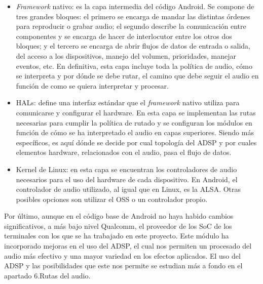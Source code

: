 \begin{itemize}
	\item{\textit{Framework} nativo: es la capa intermedia del código Android. Se compone de tres grandes bloques: el primero se encarga de mandar las distintas órdenes para reproducir o grabar audio; el segundo describe la comunicación entre componentes y se encarga de hacer de interlocutor entre los otros dos bloques; y el tercero se encarga de abrir flujos de datos de entrada o salida, del acceso a los dispositivos, manejo del volumen, prioridades, manejar eventos, etc. En definitiva, esta capa incluye toda la política de audio, cómo se interpreta y por dónde se debe rutar, el camino que debe seguir el audio en función de como se quiera interpretar y procesar.}
\end{itemize}

\begin{itemize}
	\item{\glspl{HAL}: define una interfaz estándar que el \textit{framework} nativo utiliza para comunicarse y configurar el hardware. En esta capa se implementan las rutas necesarias para cumplir la política de rutado y se configuran los módulos en función de cómo se ha interpretado el audio en capas superiores. Siendo más específicos, es aquí dónde se decide por cual topología del \gls{ADSP} y por cuales elementos hardware, relacionados con el audio, pasa el flujo de datos.}
	\item{Kernel de Linux: en esta capa se encuentran los controladores de audio necesarios para el uso del hardware de cada dispositivo. En Android, el controlador de audio utilizado, al igual que en Linux, es la \gls{ALSA}. Otras posibles opciones son utilizar el \gls{OSS} o un controlador propio.}
\end{itemize}


Por último, aunque en el código base de Android no haya habido cambios significativos, a más bajo nivel Qualcomm, el proveedor de los \gls{SoC} de los terminales con los que se ha trabajado en este proyecto. Este módulo ha incorporado mejoras en el uso del \gls{ADSP}, el cual nos permiten un procesado del audio más efectivo y una mayor variedad en los efectos aplicados. El uso del \gls{ADSP} y las posibilidades que este nos permite se estudian más a fondo en el apartado 6.Rutas del audio. %